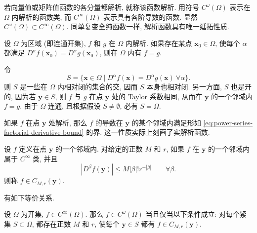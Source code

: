 若向量值或矩阵值函数的各分量都解析, 就称该函数解析. 用符号 $C^\omega(\Omega)$ 表示在 $\Omega$ 内解析的函数类, 而 $C^\infty(\Omega)$ 表示具有各阶导数的函数. 显然 $C^\omega(\Omega)\subset C^\infty(\Omega)$. 同单复变全纯函数一样, 解析函数具有唯一延拓性质.

\begin{Theorem}
\label{thm:real-analytic-unique-continuation}
设 $\Omega$ 为区域 (即连通开集), $f$ 和 $g$ 在 $\Omega$ 内解析. 如果存在某点 $\bm{x}_0\in\Omega$, 使每个 $\alpha$ 都满足 $D^\alpha f(\bm{x}_0)=D^\alpha g(\bm{x}_0)$, 则在 $\Omega$ 内有 $f=g$.
\end{Theorem}

\begin{Proof}
令
\begin{equation}\label{eq:analytic-identity-derivative-set}
S=\{\bm{x}\in\Omega\mid D^\alpha f(\bm{x})=D^\alpha g(\bm{x})\ \forall\alpha\}.
\end{equation}
则 $S$ 是一些在 $\Omega$ 内相对闭的集合的交, 因而 $S$ 本身也相对闭. 另一方面, $S$ 也是开的, 因为若 $\bm{y}\in S$, 则 $f$ 与 $g$ 在点 $\bm{y}$ 处的 Taylor 系数相同, 从而在 $\bm{y}$ 的一个邻域内 $f=g$. 由于 $\Omega$ 连通, 且根据假设 $S\ne\emptyset$, 必有 $S=\Omega$.
\end{Proof}

如果 $f$ 在点 $\bm{y}$ 处解析, 那么 $f$ 的导数在 $\bm{y}$ 的某个邻域内满足形如 \eqref{eq:power-series-factorial-derivative-bound} 的界. 这一性质实际上刻画了实解析函数.

\begin{Definition}
\label{def:factorial-derivative-class}
设 $f$ 定义在点 $\bm{y}$ 的一个邻域内. 对给定的正数 $M$ 和 $r$, 如果 $f$ 在 $\bm{y}$ 的一个邻域内属于 $C^\infty$ 类, 并且
\begin{equation}\label{eq:factorial-derivative-class-bound}
|D^\beta f(\bm{y})|\leq M|\beta|!r^{-|\beta|}\qquad\forall\beta.
\end{equation}
则称 $f\in C_{M,r}(\bm{y})$.
\end{Definition}

有如下等价关系.

\begin{Theorem}
\label{thm:factorial-bound-analytic-equivalence}
设 $\Omega$ 为开集, $f\in C^\infty(\Omega)$. 那么 $f\in C^\omega(\Omega)$ 当且仅当以下条件成立: 对每个紧集 $S\subset\Omega$, 都存在正数 $M$ 和 $r$, 使每个 $\bm{y}\in S$ 都有 $f\in C_{M,r}(\bm{y})$.
\end{Theorem}

